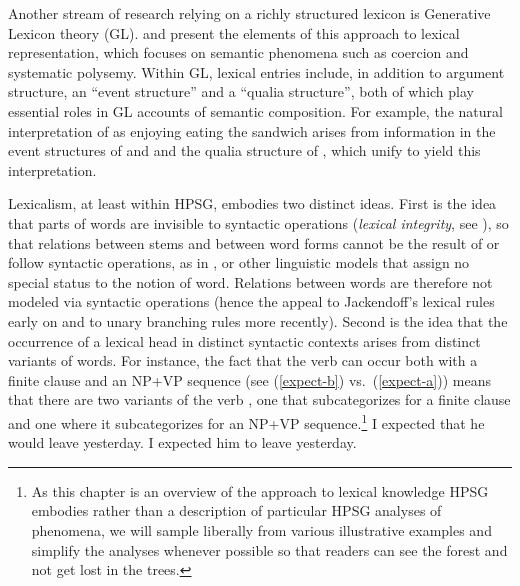 \documentclass[output=paper
 	        ,biblatex
                ,babelshorthands
                ,newtxmath
                ,draftmode
                ,colorlinks, citecolor=brown
]{langscibook}
\begin{document}
Another stream of research relying on a richly structured lexicon is Generative Lexicon theory (GL).
\citet{Pustejovsky1991,Pustejovsky1995} and \citet{PustejovskyandJezek1996} present the elements of this approach to lexical representation, which focuses on semantic phenomena such as coercion and systematic polysemy.
Within GL, lexical entries include, in addition to argument structure, an ``event structure'' and a ``qualia structure'', both of which play essential roles in GL accounts of semantic composition.
For example, the natural interpretation of  as enjoying eating the sandwich arises from information in the event structures of  and  and the qualia structure of , which unify to yield this interpretation.

Lexicalism, at least within HPSG, embodies two distinct ideas. First is the idea that parts of words
are invisible to syntactic operations (\emph{lexical integrity}, see
\citealt{BresnanandMchombo1995}), so that relations between stems and between word forms cannot be
the result of or follow syntactic operations, as in 
\citep{HalleandMarantz1993}, or other linguistic models that assign no special status to the notion
of word. Relations between words are therefore not modeled via syntactic operations (hence the
appeal to Jackendoff's lexical rules early on and to unary branching rules more recently). 
Second is the idea that the occurrence of a lexical head
in distinct syntactic contexts arises from distinct variants of words. For instance, the fact that
the verb  can occur both with a finite clause and an NP+VP sequence (see
(\ref{expect-b}) vs.\ (\ref{expect-a})) means that there are two variants of the verb ,
one that subcategorizes for a finite clause and one where it subcategorizes for an NP+VP
sequence.\footnote{As this chapter is an overview of the approach to lexical knowledge HPSG embodies
  rather than a description of particular HPSG analyses of phenomena, we will sample liberally from
  various illustrative examples and simplify the analyses whenever possible so that readers can see
  the forest and not get lost in the trees.} 
\eal
\ex \label{expect-b} I expected that he would leave yesterday.
\ex \label{expect-a} I expected him to leave yesterday.
\zl
\end{document}
